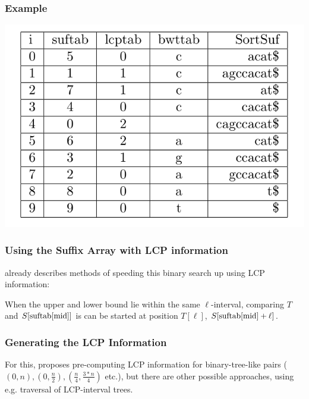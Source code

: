 \documentclass[compress,handout]{beamer} %
\begin{document}
\begin{frame}
	\frametitle{Example}
	\includegraphics[width=\textwidth, height=\textheight, keepaspectratio=true]{esa_with_bwttab_example}
\end{frame}

\begin{frame}
	\frametitle{Using the Suffix Array with LCP information}
	\cite{manber1993suffix} already describes methods of speeding
	this binary search up using LCP information:

	When the upper and lower bound lie within
	the same $\ell$-interval, comparing $T$ and
	$S[\hbox{suftab}[\hbox{mid}]]$ is can be started at position
	$T[\ell]$, $S[\hbox{suftab}[\hbox{mid}]+\ell]$.
\end{frame}

\begin{frame}
	\frametitle{Generating the LCP Information}
	For this, \cite{manber1993suffix} proposes pre-computing LCP
	information for binary-tree-like pairs
	($(0,n), (0,\frac{n}{2}), (\frac{n}{4}, \frac{3*n}{4})$ etc.),
	but there are other possible approaches, using e.g. traversal
	of LCP-interval trees.
\end{frame}
\end{document}
